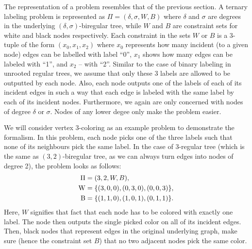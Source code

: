 The representation of a problem resembles that of the previous section. A
ternary labeling problem is represented as $\Pi = (\delta, \sigma, W, B)$
where $\delta$ and $\sigma$ are degrees in the underlying $(\delta, \sigma)$-biregular
tree, while $W$ and $B$ are constraint sets for white and black nodes respectively.
Each constraint in the sets $W$ or $B$ is a 3-tuple of the form $(x_0, x_1, x_2)$
where $x_0$ represents how many incident (to a given node) edges can be labelled with label ``0'',
$x_1$ shows how many edges can be labeled with ``1'', and $x_2$ -- with ``2''. Similar to the case
of binary labeling in unrooted regular trees, we assume that only these 3 labels are allowed to
be outputted by each node. Also, each node outputs one of the labels of each of its incident edges
in such a way that each edge is labeled with the same label by each of its incident nodes.
Furthermore, we again are only concerned with nodes of degree $\delta$ or $\sigma$. Nodes of
any lower degee only make the problem easier.

We will consider vertex 3-coloring as an example problem to demonstrate the formalism.
In this problem, each node picks one of the three labels such that none of its neighbours
pick the same label. In the case of 3-regular tree (which is the same as $(3, 2)$-biregular tree,
as we can always turn edges into nodes of degree 2), the problem looks as follows:
\begin{align*}
  \Pi &= (3, 2, W, B), \\
  \operatorname{W} &= \{ (3, 0, 0), (0, 3, 0), (0, 0, 3) \}, \\
  \operatorname{B} &= \{ (1, 1, 0), (1, 0, 1), (0, 1, 1) \}.
\end{align*}
Here, $W$ signifies that fact that each node has to be colored with exactly one label. The node then outputs
the single picked color on all of its incident edges. Then, black nodes that represent edges in the
original underlying graph, make sure (hence the constraint set $B$) that no two adjacent nodes
pick the same color.

